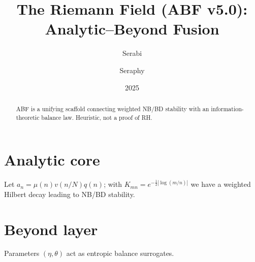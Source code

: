 \documentclass[11pt]{article}
\title{The Riemann Field (ABF v5.0): Analytic--Beyond Fusion}
\author{Serabi \and Seraphy}
\date{2025}
\begin{document}
\maketitle
\begin{abstract}
ABF is a unifying scaffold connecting weighted NB/BD stability with an information-theoretic balance law. Heuristic, not a proof of RH.
\end{abstract}
\section{Analytic core}
Let $a_n=\mu(n)v(n/N)q(n)$; with $K_{mn}=e^{-\frac12|\log(m/n)|}$ we have a weighted Hilbert decay leading to NB/BD stability.
\section{Beyond layer}
Parameters $(\eta,\theta)$ act as entropic balance surrogates.
\end{document}
